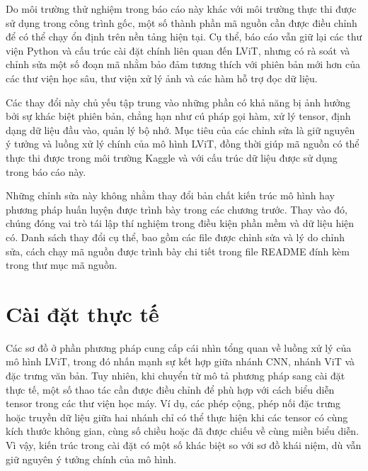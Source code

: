 
Do môi trường thử nghiệm trong báo cáo này khác với môi trường thực thi được sử dụng trong công trình gốc, một số thành phần mã nguồn cần được điều chỉnh để có thể chạy ổn định trên nền tảng hiện tại. Cụ thể, báo cáo vẫn giữ lại các thư viện Python và cấu trúc cài đặt chính liên quan đến LViT, nhưng có rà soát và chỉnh sửa một số đoạn mã nhằm bảo đảm tương thích với phiên bản mới hơn của các thư viện học sâu, thư viện xử lý ảnh và các hàm hỗ trợ đọc dữ liệu.

Các thay đổi này chủ yếu tập trung vào những phần có khả năng bị ảnh hưởng bởi sự khác biệt phiên bản, chẳng hạn như cú pháp gọi hàm, xử lý tensor, định dạng dữ liệu đầu vào, quản lý bộ nhớ. Mục tiêu của các chỉnh sửa là giữ nguyên ý tưởng và luồng xử lý chính của mô hình LViT, đồng thời giúp mã nguồn có thể thực thi được trong môi trường Kaggle và với cấu trúc dữ liệu được sử dụng trong báo cáo này.

Những chỉnh sửa này không nhằm thay đổi bản chất kiến trúc mô hình hay phương pháp huấn luyện được trình bày trong các chương trước. Thay vào đó, chúng đóng vai trò tái lập thí nghiệm trong điều kiện phần mềm và dữ liệu hiện có. Danh sách thay đổi cụ thể, bao gồm các file được chỉnh sửa và lý do chỉnh sửa, cách chạy mã nguồn được trình bày chi tiết trong file README đính kèm trong thư mục mã nguồn.

\section{Cài đặt thực tế}
Các sơ đồ ở phần phương pháp cung cấp cái nhìn tổng quan về luồng xử lý của mô hình LViT, trong đó nhấn mạnh sự kết hợp giữa nhánh CNN, nhánh ViT và đặc trưng văn bản. Tuy nhiên, khi chuyển từ mô tả phương pháp sang cài đặt thực tế, một số thao tác cần được điều chỉnh để phù hợp với cách biểu diễn tensor trong các thư viện học máy. Ví dụ, các phép cộng, phép nối đặc trưng hoặc truyền dữ liệu giữa hai nhánh chỉ có thể thực hiện khi các tensor có cùng kích thước không gian, cùng số chiều hoặc đã được chiếu về cùng miền biểu diễn. Vì vậy, kiến trúc trong cài đặt có một số khác biệt so với sơ đồ khái niệm, dù vẫn giữ nguyên ý tưởng chính của mô hình.

